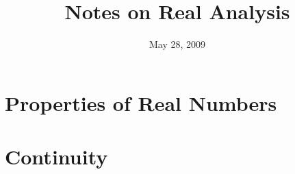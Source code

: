 \documentclass{article}
\title{Notes on Real Analysis}
\date{May 28, 2009}
\begin{document}
\maketitle
\tableofcontents
\section{Properties of Real Numbers}

\section{Continuity}


\nocite{kennethRoss}


\end{document}
